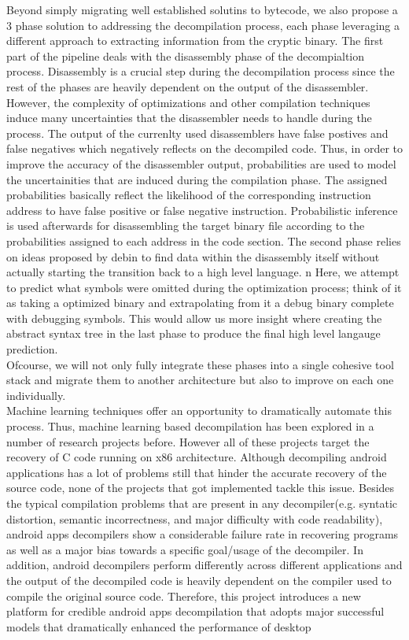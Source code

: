 \documentclass{article}
\begin{document}
\noindent Beyond simply migrating well established solutins to bytecode, we also propose a 3 phase solution to addressing the decompilation process, each phase leveraging a different approach to extracting information from the cryptic binary.
The first part of the pipeline deals with the disassembly phase of the decompialtion process. Disassembly is a crucial step during the decompilation process since the rest of the phases are heavily dependent on the output of the disassembler.
However, the complexity of optimizations and other compilation techniques induce many uncertainties that the disassembler needs to handle during the process.
The output of the currenlty used disassemblers have false postives and false negatives which negatively reflects on the decompiled code. Thus, in order to improve the accuracy of the disassembler output, probabilities are used to model the uncertainities that are induced during the compilation phase.
The assigned probabilities basically reflect the likelihood of the corresponding instruction address to have false positive or false negative instruction. Probabilistic inference is used afterwards for disassembling the target binary file according to the probabilities assigned to each address in the code section. 
The second phase relies on ideas proposed by debin to find data within the disassembly itself without actually starting the transition back to a high level language.
n
Here, we attempt to predict what symbols were omitted during the optimization process; think of it as taking a optimized binary and extrapolating from it a debug binary complete with debugging symbols.
This would allow us more insight where creating the abstract syntax tree in the last phase to produce the final high level langauge prediction. \\

\noindent Ofcourse, we will not only fully integrate these phases into a single cohesive tool stack and migrate them to another architecture but also to improve on each one individually. \\

\noindent Machine learning techniques offer an opportunity to dramatically automate this process. Thus, machine learning based decompilation has been explored in a number of research projects before. 
However all of these projects target the recovery of C code running on x86 architecture. Although decompiling android applications has a lot of problems still that hinder the accurate recovery of the source code, none of the projects that got implemented tackle this issue.
Besides the typical compilation problems that are present in any decompiler(e.g. syntatic distortion, semantic incorrectness, and major difficulty with code readability), android apps decompilers show a considerable failure rate in recovering programs as well as a major bias towards a specific goal/usage of the decompiler. In addition, android decompilers perform differently across different applications and the output of the decompiled code is heavily dependent on the compiler used to compile the original source code.
Therefore, this project introduces a new platform for credible android apps decompilation that adopts major successful models that dramatically enhanced the performance of desktop \\
\end{document}
